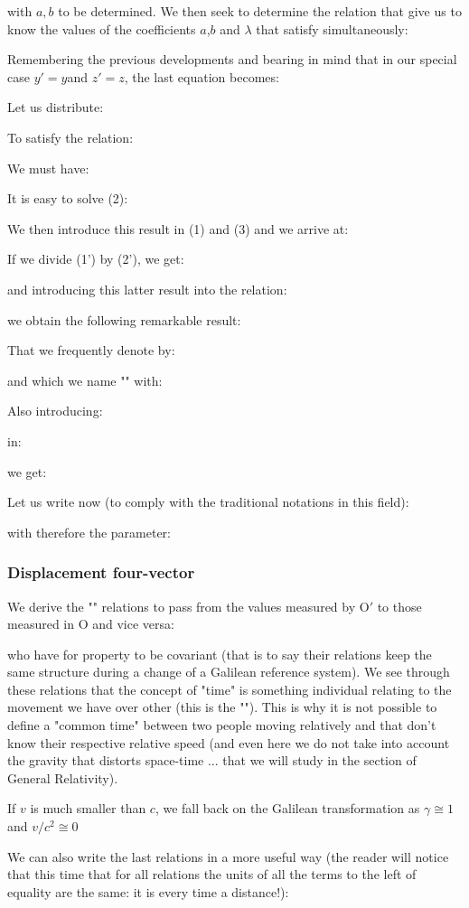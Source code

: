 	with $a,b$ to be determined.
	We then seek to determine the relation that give us to know the values of the coefficients $a$,$b$ and $\lambda$ that satisfy simultaneously:
	
	Remembering the previous developments and bearing in mind that in our special case $y '= y $and $z' = z$, the last equation becomes:
	
	Let us distribute:
	
	To satisfy the relation:
	
	We must have:
	
	It is easy to solve (2):
	
	We then introduce this result in (1) and (3) and we arrive at:
	
	If we divide (1') by (2'), we get:
	
	and introducing this latter result into the relation:
	
	we obtain the following remarkable result:
	
	That we frequently denote by:
	
	and which we name "\label{michelson morley factor}" with:
	
	Also introducing:
	
	in:
	
	we get:
	
	Let us write now (to comply with the traditional notations in this field):
	
	with therefore the parameter:
	

	\subsubsection{Displacement four-vector}
	We derive the "" relations to pass from the values measured by $\text{O}'$ to those measured in $\text{O}$ and vice versa:
	
	who have for property to be covariant (that is to say their relations keep the same structure during a change of a Galilean reference system). We see through these relations that the concept of "time" is something individual relating to the movement we have over other (this is the ""). This is why it is not possible to define a "common time" between two people moving relatively and that don't know their respective relative speed (and even here we do not take into account the gravity that distorts space-time ... that we will study in the section of General Relativity).
	\begin{tcolorbox}[title=Remark,colframe=black,arc=10pt]
	If $v$ is much smaller than $c$, we fall back on the Galilean transformation as $\gamma\cong 1$ and $v/c^2\cong 0$
	\end{tcolorbox}
	We can also write the last relations in a more useful way (the reader will notice that this time that for all relations the units of all the terms to the left of equality are the same: it is every time a distance!):
	
